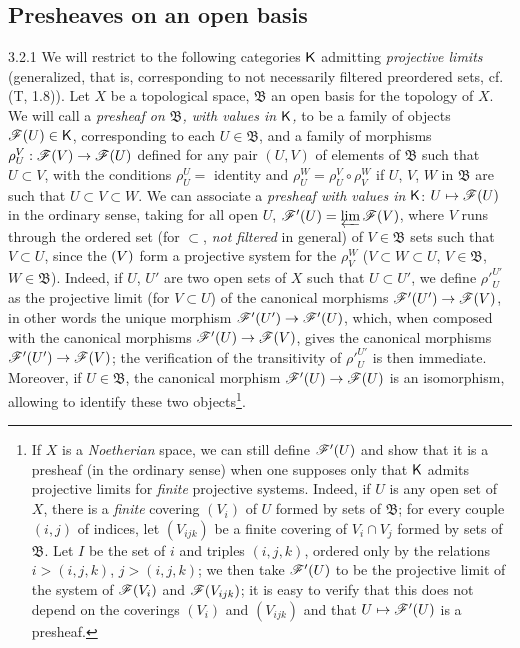 \documentclass[10pt,oneside]{book}
\begin{document}
\subsection{Presheaves on an open basis}
\label{0-prelim-3.2}

\begin{env}{3.2.1}
\label{env-0.3.2.1}
We will restrict to the following categories $\mathsf{K}$ admitting \emph{projective limits}
(generalized, that is, corresponding to not necessarily filtered preordered sets,
cf. (T, 1.8)). Let $X$ be a topological space, $\mathfrak{B}$ an open basis for the topology
of $X$. We will call a \emph{presheaf on $\mathfrak{B}$, with values in $\mathsf{K}$,} to be a family
of objects $\mathscr{F}(U)\in\mathsf{K}$, corresponding to each $U\in\mathfrak{B}$, and a family of
morphisms $\rho_U^V:\mathscr{F}(V)\to\mathscr{F}(U)$ defined for any pair $(U,V)$ of elements of
$\mathfrak{B}$ such that $U\subset V$,
with the conditions $\rho_U^U=$ identity and $\rho_U^W=\rho_U^V\circ\rho_V^W$ if $U$, $V$,
$W$ in $\mathfrak{B}$ are such that $U\subset V\subset W$. We can associate a \emph{presheaf
with values in} $\mathsf{K}$: $U\mapsto\mathscr{F}(U)$ in the ordinary sense, taking for all open $U$,
$\mathscr{F}'(U)=\varprojlim\mathscr{F}(V)$, where $V$ runs through the ordered set (for $\subset$,
\emph{not filtered} in general) of $V\in\mathfrak{B}$ sets such that $V\subset U$, since the
$\mathscr(V)$ form a projective system for the $\rho_V^W$ ($V\subset W\subset U$,
$V\in\mathfrak{B}$, $W\in\mathfrak{B}$). Indeed, if $U$, $U'$ are two open sets of $X$ such
that $U\subset U'$, we define ${\rho'}_U^{U'}$ as the projective limit (for $V\subset U$) of
the canonical morphisms $\mathscr{F}'(U')\to\mathscr{F}(V)$, in other words the unique morphism
$\mathscr{F}'(U')\to\mathscr{F}'(U)$, which, when composed with the canonical morphisms
$\mathscr{F}'(U)\to\mathscr{F}(V)$, gives the canonical morphisms $\mathscr{F}'(U')\to\mathscr{F}(V)$; the
verification of the transitivity of ${\rho'}_U^{U'}$ is then immediate. Moreover, if
$U\in\mathfrak{B}$, the canonical morphism $\mathscr{F}'(U)\to\mathscr{F}(U)$ is an isomorphism,
allowing to identify these two objects\footnote{If $X$ is a \emph{Noetherian} space, we can
still define $\mathscr{F}'(U)$ and show that it is a presheaf (in the ordinary sense) when one
supposes only that $\mathsf{K}$ admits projective limits for \emph{finite} projective systems.
Indeed, if $U$ is any open set of $X$, there is a \emph{finite} covering $(V_i)$ of $U$
formed by sets of $\mathfrak{B}$; for every couple $(i,j)$ of indices, let $(V_{ijk})$ be a
finite covering of $V_i\cap V_j$ formed by sets of $\mathfrak{B}$. Let $I$ be the set of $i$
and triples $(i,j,k)$, ordered only by the relations $i>(i,j,k)$, $j>(i,j,k)$; we then take
$\mathscr{F}'(U)$ to be the projective limit of the system of $\mathscr{F}(V_i)$ and $\mathscr{F}(V_{ijk})$;
it is easy to verify that this does not depend on the coverings $(V_i)$ and $(V_{ijk})$ and
that $U\mapsto\mathscr{F}'(U)$ is a presheaf.}.
\end{env}
\end{document}

